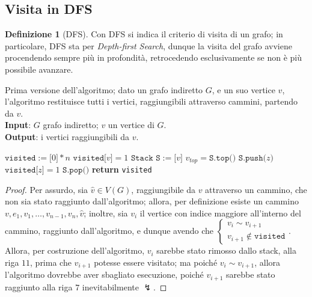 \documentclass[14pt]{extreport}
\theoremstyle{definition}
\newtheorem{definition}{Definizione}[subsection]
\theoremstyle{definition}
\begin{document}
\subsection{Visita in DFS}

\begin{definition}[DFS]
    Con DFS si indica il criterio di visita di un grafo; in particolare, DFS sta per \textit{Depth-first Search}, dunque la visita del grafo avviene procendendo sempre più in profondità, retrocedendo esclusivamente se non è più possibile avanzare.
\end{definition}

\begin{algorithm}[H]
    \caption{
        Prima versione dell'algoritmo; dato un grafo indiretto $G$, e un suo vertice $v$, l'algoritmo restituisce tutti i vertici, raggiungibili attraverso cammini, partendo da $v$.\\
        \textbf{Input}: $G$ grafo indiretto; $v$ un vertice di $G$.\\
        \textbf{Output}: i vertici raggiungibili da $v$.
    }

    \begin{algorithmic}[1]
            \State $\texttt{visited}:=\texttt{[}0\texttt{]} * n$ 
            \State $\texttt{visited[}v\texttt{]} = 1$
            \State $\texttt{Stack S}:=\texttt{[}v\texttt{]}$
                \State $v_{top}=\texttt{S.top()}$
                    \State $\texttt{S.push(}z\texttt{)}$
                    \State $\texttt{visited[}z\texttt{]} = 1$
                \Else
                    \State $\texttt{S.pop()}$
                \EndIf
            \EndWhile
            \State \textbf{return} \texttt{visited}
        \EndFunction
    \end{algorithmic}
\end{algorithm}

\begin{proof}
    Per assurdo, sia $\hat v \in V(G)$, raggiungibile da $v$ attraverso un cammino, che non sia stato raggiunto dall'algoritmo; allora, per definizione esiste un cammino $v, e_1, v_1, \ldots, v_{n - 1}, v_n, \hat v$; inoltre, sia $v_i$ il vertice con indice maggiore all'interno del cammino, raggiunto dall'algoritmo, e dunque avendo che $\left \{ \begin{array}{l}v_i \sim v_{i + 1} \\ v_{i + 1} \notin \texttt{visited}  \end{array} \right.$. Allora, per costruzione dell'algoritmo, $v_i$ sarebbe stato rimosso dallo stack, alla riga $11$, prima che $v_{i + 1}$ potesse essere visitato; ma poiché $v_i \sim v_{i +1}$, allora l'algoritmo dovrebbe aver sbagliato esecuzione, poiché $v_{i +1}$ sarebbe stato raggiunto alla riga $7$ inevitabilmente $\lightning$.
\end{proof}
\end{document}
